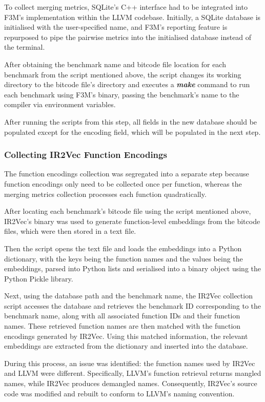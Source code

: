 To collect merging metrics, SQLite's C++ interface had to be integrated into F3M's implementation within the LLVM codebase. Initially, a SQLite database is initialised with the user-specified name, and F3M's reporting feature is repurposed to pipe the pairwise metrics into the initialised database instead of the terminal.

After obtaining the benchmark name and bitcode file location for each benchmark from the script mentioned above, the script changes its working directory to the bitcode file's directory and executes a \textbf{\textit{make}} command to run each benchmark using F3M's binary, passing the benchmark's name to the compiler via environment variables.

After running the scripts from this step, all fields in the new database should be populated except for the encoding field, which will be populated in the next step.

\subsubsection{Collecting IR2Vec Function Encodings}
The function encodings collection was segregated into a separate step because function encodings only need to be collected once per function, whereas the merging metrics collection processes each function quadratically.

After locating each benchmark's bitcode file using the script mentioned above, IR2Vec's binary was used to generate function-level embeddings from the bitcode files, which were then stored in a text file.

Then the script opens the text file and loads the embeddings into a Python dictionary, with the keys being the function names and the values being the embeddings, parsed into Python lists and serialised into a binary object using the Python Pickle library.

Next, using the database path and the benchmark name, the IR2Vec collection script accesses the database and retrieves the benchmark ID corresponding to the benchmark name, along with all associated function IDs and their function names. These retrieved function names are then matched with the function encodings generated by IR2Vec. Using this matched information, the relevant embeddings are extracted from the dictionary and inserted into the database.

During this process, an issue was identified: the function names used by IR2Vec and LLVM were different. Specifically, LLVM's function retrieval returns mangled names, while IR2Vec produces demangled names. Consequently, IR2Vec's source code was modified and rebuilt to conform to LLVM's naming convention.

